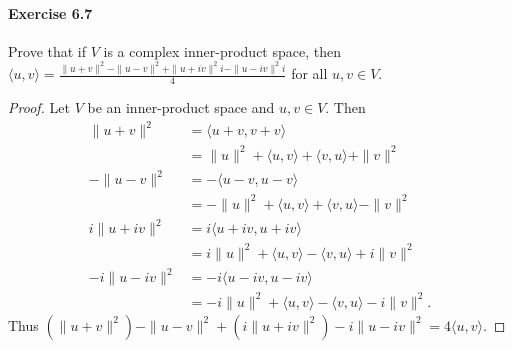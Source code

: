 \documentclass{article}
\theoremstyle{definition}
\begin{document}
\paragraph{Exercise 6.7} Prove that if $V$ is a complex inner-product space, then $\langle u, v\rangle=\frac{\|u+v\|^{2}-\|u-v\|^{2}+\|u+i v\|^{2} i-\|u-i v\|^{2} i}{4}$ for all $u, v \in V$.
\begin{proof}
Let $V$ be an inner-product space and $u, v\in V$. Then 
$$
\begin{aligned}
\|u+v\|^2 & =\langle u+v, v+v\rangle \\
& =\|u\|^2+\langle u, v\rangle+\langle v, u\rangle+\|v\|^2 \\
-\|u-v\|^2 & =-\langle u-v, u-v\rangle \\
& =-\|u\|^2+\langle u, v\rangle+\langle v, u\rangle-\|v\|^2 \\
i\|u+i v\|^2 & =i\langle u+i v, u+i v\rangle \\
& =i\|u\|^2+\langle u, v\rangle-\langle v, u\rangle+i\|v\|^2 \\
-i\|u-i v\|^2 & =-i\langle u-i v, u-i v\rangle \\
& =-i\|u\|^2+\langle u, v\rangle-\langle v, u\rangle-i\|v\|^2 .
\end{aligned}
$$
Thus $\left(\|u+v\|^2\right)-\|u-v\|^2+\left(i\|u+i v\|^2\right)-i\|u-i v\|^2=4\langle u, v\rangle.$
\end{proof}
\end{document}
